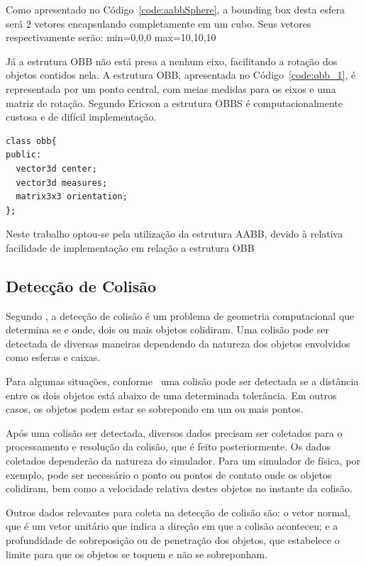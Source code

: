 Como apresentado no Código~\ref{code:aabbSphere}, a bounding box desta esfera será 2 vetores encapsulando completamente em um cubo. Seus vetores respectivamente serão: min=0,0,0 max=10,10,10

Já a estrutura OBB não está presa a nenhum eixo, facilitando a rotação dos objetos contidos nela. A estrutura OBB, apresentada no Código~\ref{code:obb_1},  é representada por um ponto central, com meias medidas para os eixos e uma matriz de rotação. Segundo Ericson a estrutura OBBS é computacionalmente custosa e de difícil implementação.

\begin{lstlisting}[frame=single,caption=Código de exemplo de OBB\label{code:obb_1}]
class obb{
public:
  vector3d center;
  vector3d measures;
  matrix3x3 orientation;
};
\end{lstlisting}

Neste trabalho optou-se pela utilização da estrutura AABB, devido à relativa facilidade de implementação em relação a estrutura OBB

\subsection{Detecção de Colisão}
Segundo , a detecção de colisão é um problema de geometria computacional que
determina se e onde, dois ou mais objetos colidiram.
Uma colisão pode ser detectada de diversas maneiras dependendo da natureza dos
objetos envolvidos como esferas e caixas.

Para algumas situações, conforme~ uma colisão pode ser detectada se a distância entre os dois objetos está abaixo de uma
determinada tolerância. Em outros casos, os objetos podem estar se sobrepondo em um ou mais pontos.

Após uma colisão ser detectada, diversos dados precisam ser coletados para o processamento e resolução da colisão, que é feito posteriormente. Os dados coletados dependerão da natureza do simulador. Para um simulador de física, por exemplo, pode ser necessário o ponto ou pontos de contato onde os objetos colidiram, bem como a velocidade relativa destes objetos no instante da colisão.

Outros dados relevantes para coleta na detecção de colisão são: o vetor normal, que é um vetor unitário que indica a direção em que a colisão aconteceu; e  a profundidade de sobreposição ou de penetração dos objetos, que estabelece o limite para que os objetos se toquem e não se sobreponham.


